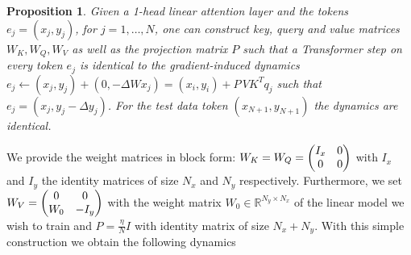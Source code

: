 \documentclass{article}
\newtheorem{prop}{Proposition}
\theoremstyle{plain}
\theoremstyle{definition}
\theoremstyle{remark}
\begin{document}
\setcounter{prop}{0}
\begin{prop}

Given a 1-head linear attention layer and the tokens $e_j = (x_j, y_j)$, for $j=1,\ldots,N$, one can construct key, query and value matrices $W_K, W_Q, W_V$ as well as the projection matrix $P$ such that a Transformer step on every token $e_j$ is identical to the gradient-induced dynamics $ e_j \leftarrow (x_j, y_j) + (0, -\Delta W x_j) = (x_i, y_{i}) + P \,V K^{T}q_{j}$ such that $e_j = (x_j, y_j - \Delta y_j)$. For the test data token $(x_{N+1}, y_{N+1})$ the dynamics are identical.
\end{prop}
We provide the weight matrices in block form: $W_{K} = W_{Q} = \left(\begin{array}{@{}c c@{}}
  I_x
  & 0 \\
  0 &
  0
\end{array}\right)
$ with $I_x$ and $I_y$ the identity matrices of size $N_x$ and $N_y$ respectively. Furthermore, we set $W_{V} = \left(\begin{array}{@{}c c@{}}
  0
  & 0 \\
  W_0 &
  -I_y
\end{array}\right)$ with the weight matrix $W_0 \in \mathbb{R}^{N_y \times N_x}$ of the linear model we wish to train and $P = \frac{\eta}{N}I$ with identity matrix of size $N_x + N_y$. With this simple construction we obtain the following dynamics 
\end{document}
